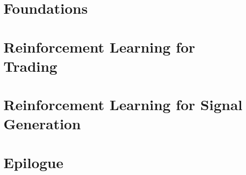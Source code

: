 \documentclass[12pt,a4paper]{Thesis} %
\begin{document}

\mainmatter       %

\fancyhead{}   %
\fancyhead[LO]{\sl{\leftmark}}
\fancyhead[RE]{\sl{\rightmark}}
\fancyhead[LE,RO]{\thepage}



\part{Foundations}
\part{Reinforcement Learning for Trading}
\part{Reinforcement Learning for Signal Generation}
\part{Epilogue}




\cleardoublepage    %

\backmatter


\label{Bibliography}


\end{document}
